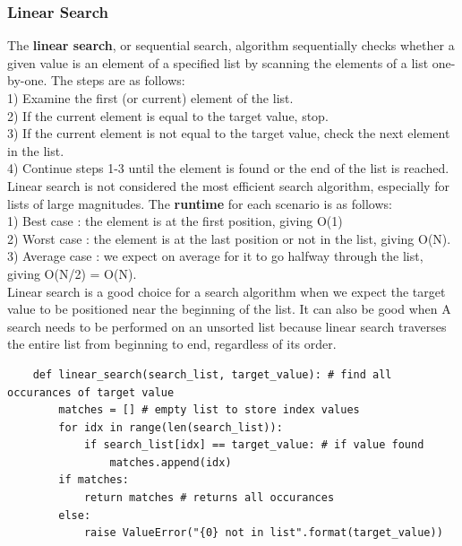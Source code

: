 \documentclass[11pt, a4paper]{article}
\begin{document}
\begin{spacing}{1.1}
	\subsubsection{Linear Search}
	The \textbf{linear search}, or sequential search, algorithm sequentially checks whether a given value is an element of a specified list by scanning the elements of a list one-by-one. The steps are as follows: \\
	\hspace*{3mm} 1) Examine the first (or current) element of the list. \\
	\hspace*{3mm} 2) If the current element is equal to the target value, stop.\\
	\hspace*{3mm} 3) If the current element is not equal to the target value, check the next element in the list.\\
	\hspace*{3mm} 4) Continue steps 1-3 until the element is found or the end of the list is reached. \vspace*{2mm} \\
	Linear search is not considered the most efficient search algorithm, especially for lists of large magnitudes. The \textbf{runtime} for each scenario is as follows: \\
	\hspace*{3mm} 1) Best case : the element is at the first position, giving O(1) \\
	\hspace*{3mm} 2) Worst case : the element is at the last position or not in the list, giving O(N). \\
	\hspace*{3mm} 3) Average case : we expect on average for it to go halfway through the list, giving O(N/2) = O(N). \vspace*{2mm} \\
	Linear search is a good choice for a search algorithm when we expect the target value to be positioned near the beginning of the list. It can also be good when A search needs to be performed on an unsorted list because linear search traverses the entire list from beginning to end, regardless of its order.
	\begin{lstlisting}
	def linear_search(search_list, target_value): # find all occurances of target value
		matches = [] # empty list to store index values
		for idx in range(len(search_list)):
			if search_list[idx] == target_value: # if value found
				matches.append(idx) 
		if matches:
			return matches # returns all occurances
		else:
			raise ValueError("{0} not in list".format(target_value)) \end{lstlisting} \vspace*{1mm}	

\end{spacing}
\end{document}
